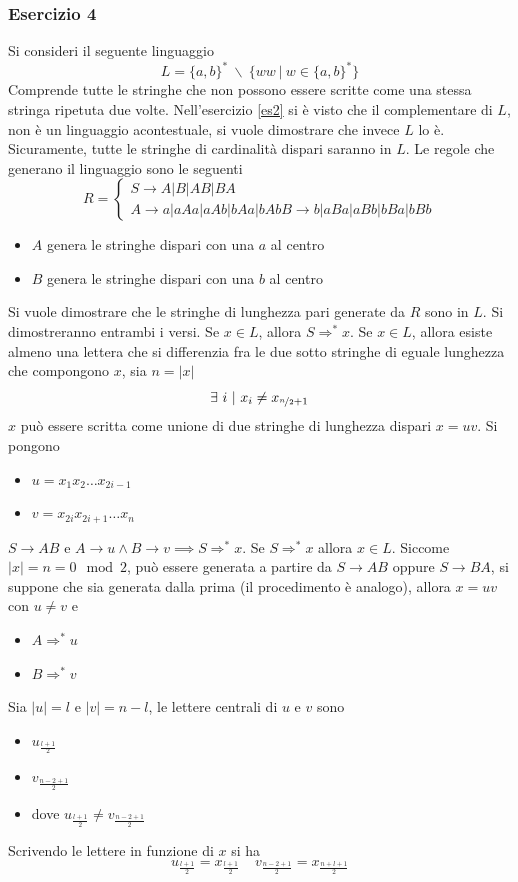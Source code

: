 \documentclass[10pt, letterpaper]{report}
\begin{document}
\subsubsection{Esercizio 4}
Si consideri il seguente linguaggio $$ L=\{a,b\}^* \ \backslash \ \{ww\ | \ w\in\{a,b\}^*\}$$
Comprende tutte le stringhe che non possono essere scritte come una stessa stringa ripetuta due volte. Nell'esercizio 
\ref{es2} si è visto 
che il complementare di $L$, non è un linguaggio acontestuale, si vuole dimostrare che invece $L$ lo è. Sicuramente, 
tutte le stringhe di cardinalità dispari saranno in $L$. Le regole che generano il linguaggio sono le seguenti$$ 
R=\begin{cases}
    S\longrightarrow A|B|AB|BA\\ 
    A\longrightarrow a|aAa|aAb|bAa|bAb 
    B\longrightarrow b|aBa|aBb|bBa|bBb 
\end{cases}
$$\begin{itemize}
    \item $A$ genera le stringhe dispari con una $a$ al centro
    \item $B$ genera le stringhe dispari con una $b$ al centro
\end{itemize}
\dimo{}  Si vuole dimostrare che le stringhe di lunghezza pari generate da $R$ sono in $L$. Si dimostreranno entrambi i 
versi.\acc 
\boxedMath{$\implies$} Se $x\in L$, allora $S\Rightarrow^* x$. Se $x\in L$, allora esiste almeno una lettera che si differenzia fra le due sotto stringhe di eguale 
lunghezza che compongono $x$, sia $n=|x|$
$$\exists \ i \ | \ x_i\ne x_{\nicefrac{n}{2}+1} $$
$x$ può essere scritta come unione di due 
stringhe di lunghezza dispari $x=uv$. Si pongono \begin{itemize}
    \item $u=x_1x_2\dots x_{2i-1}$
    \item $v=x_{2i}x_{2i+1}\dots x_n$
\end{itemize}
$S\longrightarrow AB$ e $A\longrightarrow u \land B\longrightarrow v \implies S\Rightarrow^* x$.\acc 
\boxedMath{$\impliedby$} Se $S\Rightarrow^* x$ allora $x\in L$. 
Siccome $|x|=n=0\mod 2$, può essere generata a partire da $S\longrightarrow AB$ oppure $S\longrightarrow BA$, si suppone che 
sia generata dalla prima (il procedimento è analogo), 
allora $x=uv$ con $u\ne v$ e \begin{itemize}
    \item $A\Rightarrow^* u$
    \item $B\Rightarrow^* v$
\end{itemize}
Sia $|u|=l$ e $|v|=n-l$, le lettere centrali di $u$ e $v$ sono \begin{itemize}
    \item $u_{\frac{l+1}{2}}$
    \item $v_{\frac{n-2+1}{2}}$
    \item dove $u_{\frac{l+1}{2}}\ne v_{\frac{n-2+1}{2}}$
\end{itemize}
Scrivendo le lettere in funzione di $x$ si ha 
$$ u_{\frac{l+1}{2}}=x_{\frac{l+1}{2}} \ \ \ \  \  v_{\frac{n-2+1}{2}}=x_{\frac{n+l+1}{2}}
$$
\end{document}
